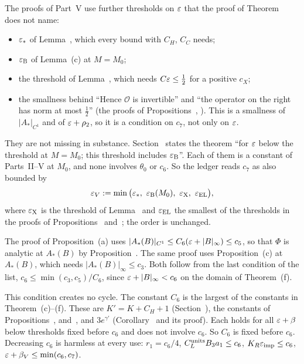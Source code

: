 \begin{detail}
\begin{step}
The proofs of Part~V use further thresholds on $\varepsilon$ that the proof of Theorem~ does not name:
\begin{itemize}
\item $\varepsilon_*$ of Lemma~, which every bound with $C_H$, $C_C$ needs;
\item $\varepsilon_{\rm B}$ of Lemma~(c) at $M=M_0$;
\item the threshold of Lemma~, which needs $C\varepsilon\le\frac12$ for a positive $c_X$;
\item the smallness behind ``Hence $\mathcal O$ is invertible'' and ``the operator on the right has norm at most $\frac12$'' (the proofs of Propositions~, ). This is a smallness of $|A_*|_{C^1}$ and of $\varepsilon+\rho_2$, so it is a condition on $c_7$, not only on $\varepsilon$.
\end{itemize}
They are not missing in substance. Section~ states the theorem ``for $\varepsilon$ below the threshold at $M=M_0$; this threshold includes $\varepsilon_{\rm B}$''. Each of them is a constant of Parts~II--V at $M_0$, and none involves $\theta_0$ or $c_6$. So the ledger reads $c_7$ as also bounded by
\[
\eps_V:=\min\big(\eps_*,\ \eps_{\rm B}(M_0),\ \eps_{\rm X},\ \eps_{\rm EL}\big),
\]
where $\varepsilon_{\rm X}$ is the threshold of Lemma~ and $\varepsilon_{\rm EL}$ the smallest of the thresholds in the proofs of Propositions~ and~; the order is unchanged.
\end{step}

\begin{step}
The proof of Proposition~(a) uses $|A_*(B)|_{C^1}\le C_6(\varepsilon+|B|_\infty)\le c_5$, so that $\Phi$ is analytic at $A_*(B)$ by Proposition~. The same proof uses Proposition~(c) at $A_*(B)$, which needs $|A_*(B)|_\infty\le c_3$. Both follow from the last condition of the list, $c_6\le\min(c_3,c_5)/C_6$, since $\varepsilon+|B|_\infty<c_6$ on the domain of Theorem~(f).

This condition creates no cycle. The constant $C_6$ is the largest of the constants in Theorem~(c)--(f). These are $K'=K+C_H+1$ (Section~), the constants of Propositions~,  and~, and $3e^{\gamma'}$ (Corollary~ and its proof). Each holds for all $\varepsilon+\beta$ below thresholds fixed before $c_6$ and does not involve $c_6$. So $C_6$ is fixed before $c_6$. Decreasing $c_6$ is harmless at every use: $r_1=c_6/4$, $C^{\rm units}_LB_3a_1\le c_6$, $K_R\varepsilon_{\rm imp}\le c_6$, $\varepsilon+\beta_V\le\min(c_6,c_7)$.


\end{step}
\end{detail}

